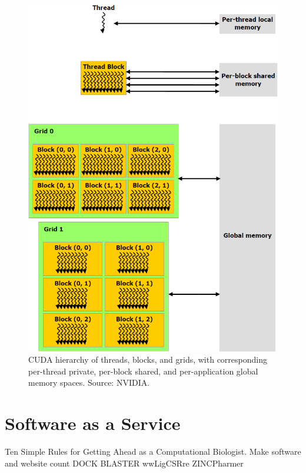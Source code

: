 \begin{figure}
\centering
\includegraphics[width=\textwidth]{GPU/CUDAMemoryHierarchy.png}
\caption{CUDA hierarchy of threads, blocks, and grids, with corresponding per-thread private, per-block shared, and per-application global memory spaces. Source: NVIDIA.}
\label{GPU:CUDAMemoryHierarchy}
\end{figure}

\section{Software as a Service}

Ten Simple Rules for Getting Ahead as a Computational Biologist. Make software and website count \citep{260}
DOCK BLASTER
wwLigCSRre
ZINCPharmer


\chapterend
